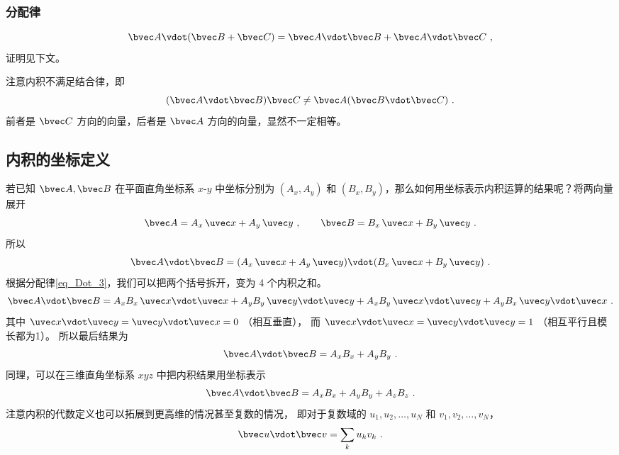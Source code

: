 \subsubsection{分配律}
\begin{equation}\label{eq_Dot_3}
\bvec A \vdot (\bvec B + \bvec C) = \bvec A \vdot \bvec B + \bvec A \vdot \bvec C~,
\end{equation}
证明见下文。

注意内积不满足结合律，即
\begin{equation}
(\bvec A \vdot \bvec B) \bvec C \ne  \bvec A (\bvec B \vdot \bvec C)~.
\end{equation}
前者是 $\bvec C$ 方向的向量，后者是 $\bvec A$ 方向的向量，显然不一定相等。

\subsection{内积的坐标定义}
若已知 $\bvec A, \bvec B$ 在平面直角坐标系 $x$-$y$ 中坐标分别为 $(A_x, A_y)$ 和  $(B_x, B_y)$，那么如何用坐标表示内积运算的结果呢？将两向量展开
\begin{equation}
\bvec A = A_x \,\uvec x + A_y \,\uvec y ~,\qquad \bvec B = B_x \,\uvec x + B_y \,\uvec y~.
\end{equation}
所以
\begin{equation}
\bvec A \vdot \bvec B = (A_x \,\uvec x + A_y \,\uvec y) \vdot (B_x \,\uvec x + B_y \,\uvec y)~.
\end{equation}
根据分配律\autoref{eq_Dot_3}，我们可以把两个括号拆开，变为 4 个内积之和。 
\begin{equation}
\bvec A \vdot \bvec B = A_x B_x \,\uvec x \vdot \uvec x + A_y B_y \,\uvec y \vdot \uvec y + A_x B_y \,\uvec x \vdot \uvec y + A_y B_x \,\uvec y \vdot \uvec x~.
\end{equation}
其中 $\uvec x \vdot \uvec y = \uvec y \vdot \uvec x = 0$ （相互垂直）， 而 $\uvec x \vdot \uvec x = \uvec y \vdot \uvec y = 1$ （相互平行且模长都为1）。 所以最后结果为
\begin{equation}\label{eq_Dot_5}
\bvec A \vdot \bvec B = A_x B_x + A_y B_y~.
\end{equation}
同理，可以在三维直角坐标系 $xyz$ 中把内积结果用坐标表示
\begin{equation}\label{eq_Dot_4}
\bvec A \vdot \bvec B = A_x B_x + A_y B_y + A_z B_z	~.
\end{equation}
注意内积的代数定义也可以拓展到更高维的情况甚至复数的情况， 即对于复数域的 $u_1, u_2, \dots, u_N$ 和 $v_1, v_2, \dots, v_N$，
\begin{equation}
\bvec u \vdot \bvec v = \sum_k u_k v_k~.
\end{equation}

